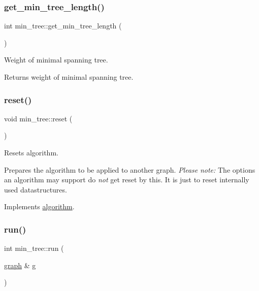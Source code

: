 \subsubsection{\texorpdfstring{get\+\_\+min\+\_\+tree\+\_\+length()}{get\_min\_tree\_length()}}
{\footnotesize\ttfamily int min\+\_\+tree\+::get\+\_\+min\+\_\+tree\+\_\+length (\begin{DoxyParamCaption}{ }\end{DoxyParamCaption})}



Weight of minimal spanning tree. 

\begin{DoxyReturn}{Returns}
weight of minimal spanning tree. 
\end{DoxyReturn}
\mbox{\label{classmin__tree_a0edbe612424dc5f4de4701b8fd0df931}} 
\subsubsection{\texorpdfstring{reset()}{reset()}}
{\footnotesize\ttfamily void min\+\_\+tree\+::reset (\begin{DoxyParamCaption}{ }\end{DoxyParamCaption})\hspace{0.3cm}{\ttfamily [virtual]}}



Resets algorithm. 

Prepares the algorithm to be applied to another graph. {\itshape Please} {\itshape note\+:} The options an algorithm may support do {\itshape not} get reset by this. It is just to reset internally used datastructures. 

Implements \mbox{\hyperlink{classalgorithm_a21aba63d066ae7897de6ca7d8425c408}{algorithm}}.

\mbox{\label{classmin__tree_ac025e8dad0db7a6a1e0e7b476b547802}} 
\subsubsection{\texorpdfstring{run()}{run()}}
{\footnotesize\ttfamily int min\+\_\+tree\+::run (\begin{DoxyParamCaption}\item[{\mbox{\hyperlink{classgraph}{graph}} \&}]{g }\end{DoxyParamCaption})\hspace{0.3cm}{\ttfamily [virtual]}}



